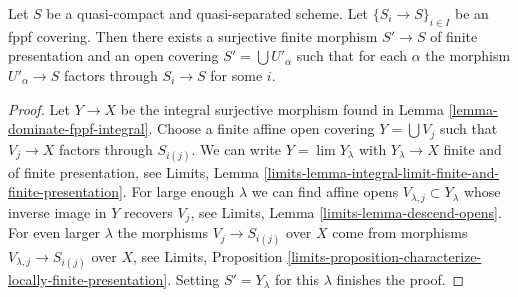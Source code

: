 \begin{lemma}
\label{lemma-dominate-fppf-finite}
Let $S$ be a quasi-compact and quasi-separated scheme.
Let $\{S_i \to S\}_{i \in I}$ be an fppf covering.
Then there exists a surjective finite morphism $S' \to S$
of finite presentation and an
open covering $S' = \bigcup U'_\alpha$ such that for each $\alpha$ the
morphism $U'_\alpha \to S$ factors through $S_i \to S$ for some $i$.
\end{lemma}

\begin{proof}
Let $Y \to X$ be the integral surjective morphism found in
Lemma \ref{lemma-dominate-fppf-integral}.
Choose a finite affine open covering $Y = \bigcup V_j$
such that $V_j \to X$ factors through $S_{i(j)}$.
We can write $Y = \lim Y_\lambda$ with
$Y_\lambda \to X$ finite and of finite presentation, see
Limits, Lemma \ref{limits-lemma-integral-limit-finite-and-finite-presentation}.
For large enough $\lambda$ we can find affine opens
$V_{\lambda, j} \subset Y_\lambda$
whose inverse image in $Y$ recovers $V_j$, see
Limits, Lemma \ref{limits-lemma-descend-opens}.
For even larger $\lambda$ the morphisms $V_j \to S_{i(j)}$
over $X$ come from morphisms $V_{\lambda, j} \to S_{i(j)}$ over
$X$, see
Limits, Proposition
\ref{limits-proposition-characterize-locally-finite-presentation}.
Setting $S' = Y_\lambda$ for this $\lambda$ finishes the proof.
\end{proof}
